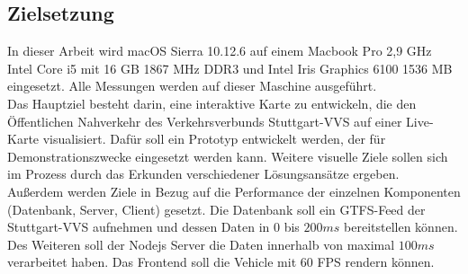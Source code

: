 \subsection{Zielsetzung}
\label{sub:zielsetzung}
  In dieser Arbeit wird macOS Sierra 10.12.6 auf einem Macbook Pro 2,9 GHz Intel Core i5 mit 16 GB 1867 MHz DDR3 und Intel Iris Graphics 6100 1536 MB eingesetzt. Alle Messungen werden auf dieser Maschine ausgeführt.\\

  Das Hauptziel besteht darin, eine interaktive Karte zu entwickeln, die den Öffentlichen Nahverkehr des Verkehrsverbunds Stuttgart-VVS auf einer Live-Karte visualisiert. Dafür soll ein Prototyp entwickelt werden, der für Demonstrationszwecke eingesetzt werden kann. Weitere visuelle Ziele sollen sich im Prozess durch das Erkunden verschiedener Lösungsansätze ergeben. \\

  Außerdem werden Ziele in Bezug auf die Performance der einzelnen Komponenten (Datenbank, Server, Client) gesetzt. Die Datenbank soll ein GTFS-Feed der Stuttgart-VVS aufnehmen und dessen Daten in $0$ bis $200ms$ bereitstellen können. Des Weiteren soll der Nodejs Server die Daten innerhalb von maximal $100ms$ verarbeitet haben. Das Frontend soll die Vehicle mit 60 FPS rendern können.

